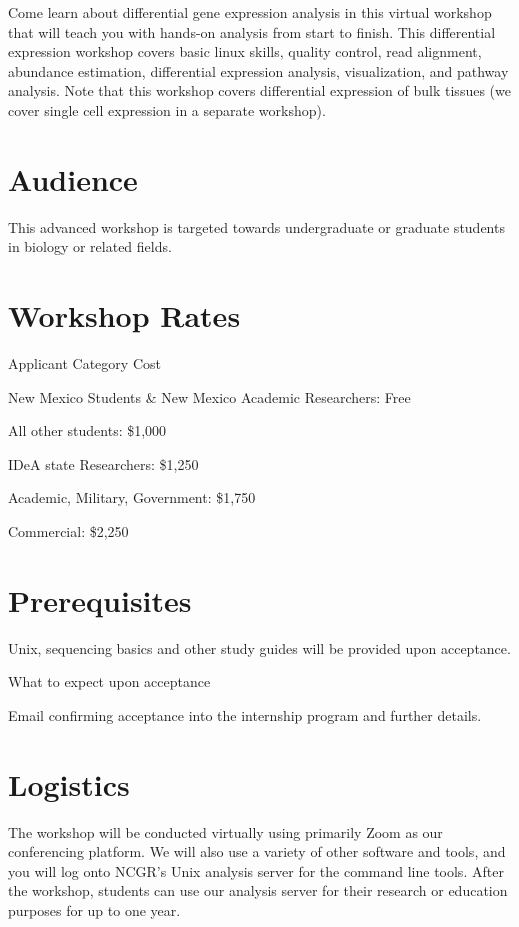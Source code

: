 \documentclass[
]{book}
\begin{document}
Come learn about differential gene expression analysis in this virtual workshop that will teach you with hands-on analysis from start to finish. This differential expression workshop covers basic linux skills, quality control, read alignment, abundance estimation, differential expression analysis, visualization, and pathway analysis. Note that this workshop covers differential expression of bulk tissues (we cover single cell expression in a separate workshop).

\hypertarget{audience-2}{%
\section{Audience}\label{audience-2}}

This advanced workshop is targeted towards undergraduate or graduate students in biology or related fields.

\hypertarget{workshop-rates-2}{%
\section{Workshop Rates}\label{workshop-rates-2}}

Applicant Category Cost

New Mexico Students \& New Mexico Academic Researchers:
Free

All other students:
\$1,000

IDeA state Researchers:
\$1,250

Academic, Military, Government:
\$1,750

Commercial:
\$2,250

\hypertarget{prerequisites-2}{%
\section{Prerequisites}\label{prerequisites-2}}

Unix, sequencing basics and other study guides will be provided upon acceptance.

What to expect upon acceptance

Email confirming acceptance into the internship program and further details.

\hypertarget{logistics-2}{%
\section{Logistics}\label{logistics-2}}

The workshop will be conducted virtually using primarily Zoom as our conferencing platform. We will also use a variety of other software and tools, and you will log onto NCGR's Unix analysis server for the command line tools. After the workshop, students can use our analysis server for their research or education purposes for up to one year.
\end{document}
